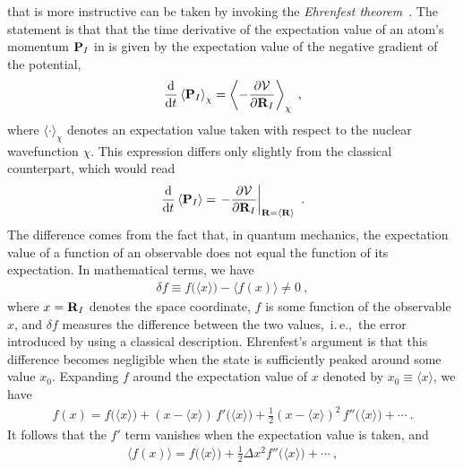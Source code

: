  that is more instructive can be taken by invoking the \emph{Ehrenfest theorem}~\cite{Ehrenfest1927,Basdevant2007}. The statement is that that the time derivative of the expectation value of an atom's momentum ${\bf P}_I$ in is given by the expectation value of the negative gradient of the potential,
\begin{align}
\frac{\d}{\d t} \left\langle {\bf P}_I \right\rangle_{\chi}
= \left\langle
- \frac{\partial \mathcal{V}}{\partial {\bf R}_I}
\right\rangle_{\chi}~,
\label{eq:ehrenfest.de1}
\end{align}
where $\langle \cdot \rangle_{\chi}$ denotes an expectation value taken with respect to the nuclear wavefunction $\chi$. This expression differs only slightly from the classical counterpart, which would read
\begin{align}
\frac{\d}{\d t} \left\langle {\bf P}_I \right\rangle
= \left.
- \frac{\partial \mathcal{V}}{\partial {\bf R}_I}
\right\vert_{{\bf R} = \langle {\bf R} \rangle}~.
\label{eq:ehrenfest.de2}
\end{align}
The difference comes from the fact that, in quantum mechanics, the expectation value of a function of an observable does not equal the function of its expectation. In mathematical terms, we have
\begin{align}
\delta f  \equiv 
f \bm ( \langle x \rangle \bm{)} 
- 
\bm{\langle} f (x) \bm{\rangle}
\neq 0
~,
\label{eq:ehrenfest.delta1}
\end{align}
where $x = {\bf R}_I$ denotes the space coordinate, %
$f$ is some function of the observable   $x$, and $\delta f$ measures the difference between the two values,~i.\,e.,~the error introduced by using a classical description. Ehrenfest's argument is that this difference becomes negligible when the state is sufficiently peaked around some value $x_0$. Expanding $f$ around the expectation value of $x$ denoted by $x_0 \equiv \langle x \rangle$, we have
\begin{align}
f(x) = f \bm ( \langle x \rangle \bm{)}  
+ (x - \langle x \rangle) \, f' \bm ( \langle x \rangle \bm{)}
+ \frac{1}{2} (x - \langle x \rangle)^2 \, f'' \bm ( \langle x \rangle \bm{)}
+ \cdots~.
\label{eq:ehrenfest.f2}
\end{align}
It follows that the $f'$ term vanishes when the expectation value is taken, and
\begin{align}
\langle f(x) \rangle 
= f \bm ( \langle x \rangle \bm{)}  
+ \frac{1}{2} \Delta x^2 f'' \bm ( \langle x \rangle \bm{)}
+ \cdots~,
\label{eq:ehrenfest.f3}
\end{align}
